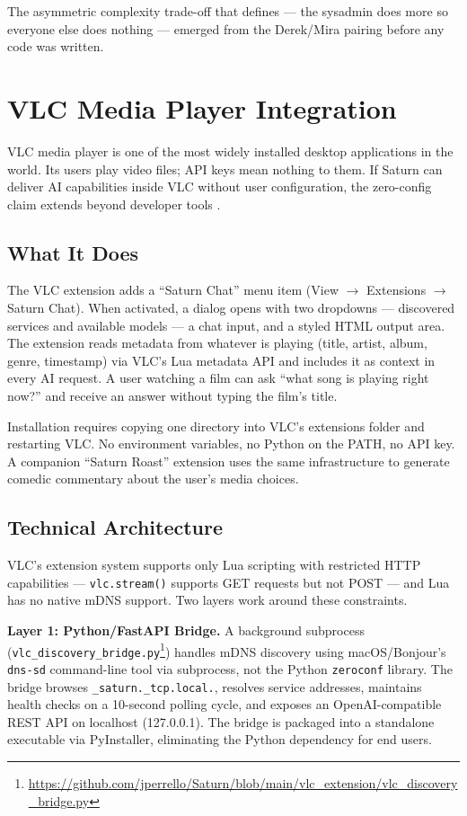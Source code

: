 The asymmetric complexity trade-off that defines  --- the sysadmin does more so everyone else does nothing --- emerged from the Derek/Mira pairing before any code was written.

\section{VLC Media Player Integration}
\label{sec:vlc-case-study}

VLC media player is one of the most widely installed desktop applications in the world. Its users play video files; API keys mean nothing to them. If Saturn can deliver AI capabilities inside VLC without user configuration, the zero-config claim extends beyond developer tools .

\subsection{What It Does}

The VLC extension adds a ``Saturn Chat'' menu item (View $\to$ Extensions $\to$ Saturn Chat). When activated, a dialog opens with two dropdowns --- discovered services and available models --- a chat input, and a styled HTML output area. The extension reads metadata from whatever is playing (title, artist, album, genre, timestamp) via VLC's Lua metadata API and includes it as context in every AI request. A user watching a film can ask ``what song is playing right now?'' and receive an answer without typing the film's title.

Installation requires copying one directory into VLC's extensions folder and restarting VLC. No environment variables, no Python on the PATH, no API key. A companion ``Saturn Roast'' extension uses the same infrastructure to generate comedic commentary about the user's media choices.

\subsection{Technical Architecture}

VLC's extension system supports only Lua scripting with restricted HTTP capabilities --- \texttt{vlc.stream()} supports GET requests but not POST --- and Lua has no native mDNS support. Two layers work around these constraints.

\textbf{Layer 1: Python/FastAPI Bridge.} A background subprocess (\texttt{vlc\_discovery\_bridge.py}\footnote{\url{https://github.com/jperrello/Saturn/blob/main/vlc_extension/vlc_discovery_bridge.py}}) handles mDNS discovery using macOS/Bonjour's \texttt{dns-sd} command-line tool via subprocess, not the Python \texttt{zeroconf} library. The bridge browses \texttt{\_saturn.\_tcp.local.}, resolves service addresses, maintains health checks on a 10-second polling cycle, and exposes an OpenAI-compatible REST API on localhost (127.0.0.1). The bridge is packaged into a standalone executable via PyInstaller, eliminating the Python dependency for end users.

